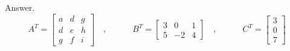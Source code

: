 \documentclass[11pt]{amsbook}
\begin{document}
Answer.
\quad
$$
A^{T}=
\begin{bmatrix} 
a & d & g\\
d & e & h\\
g & f & i
\end{bmatrix}
\quad
,
\quad
\quad
\quad
B^{T}=
\begin{bmatrix} 
3 & 0 & 1\\
5 & -2 & 4
\end{bmatrix}
\quad
,
\quad
\quad
\quad
C^{T}=
\begin{bmatrix} 
3\\
0\\
7
\end{bmatrix}
$$
\end{document}
